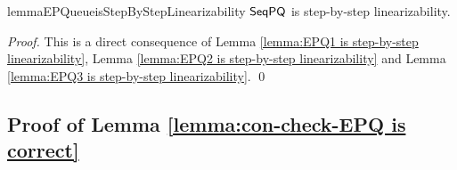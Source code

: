 
\begin{restatable}{lemma}{EPQueueisStepByStepLinearizability}
\label{lemma:EPQ is step-by-step linearizability}
$\mathsf{SeqPQ}$ is step-by-step linearizability.
\end{restatable}

\begin {proof}
This is a direct consequence of Lemma \ref{lemma:EPQ1 is step-by-step linearizability}, Lemma \ref{lemma:EPQ2 is step-by-step linearizability} and Lemma \ref{lemma:EPQ3 is step-by-step linearizability}. \qed
\end {proof}



\subsection{Proof of Lemma \ref{lemma:con-check-EPQ is correct}}
\label{sec:appendix subsection proof of lemma con-check-EPQ is correct}


\ConCheckEPQIsCorrect*

